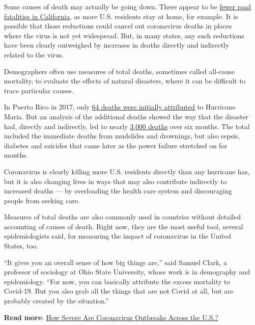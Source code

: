 Some causes of death may actually be going down. There appear to be
\href{https://roadecology.ucdavis.edu/files/content/projects/COVID_CHIPs_Impacts_updated_415.pdf}{fewer
road fatalities in California}, as more U.S. residents stay at home, for
example. It is possible that those reductions could cancel out
coronavirus deaths in places where the virus is not yet widespread. But,
in many states, any such reductions have been clearly outweighed by
increases in deaths directly and indirectly related to the virus.

Demographers often use measures of total deaths, sometimes called
all-cause mortality, to evaluate the effects of natural disasters, where
it can be difficult to trace particular causes.

In Puerto Rico in 2017, only
\href{https://www.nytimes3xbfgragh.onion/2018/08/28/us/puerto-rico-hurricane-maria-deaths.html}{64
deaths were initially attributed} to Hurricane Maria. But an analysis of
the additional deaths showed the way that the disaster had, directly and
indirectly, led to nearly
\href{https://prstudy.publichealth.gwu.edu/sites/prstudy.publichealth.gwu.edu/files/reports/Acertainment\%20of\%20the\%20Estimated\%20Excess\%20Mortality\%20from\%20Hurricane\%20Maria\%20in\%20Puerto\%20Rico.pdf}{3,000
deaths} over six months. The total included the immediate deaths from
mudslides and drownings, but also sepsis, diabetes and suicides that
came later as the power failure stretched on for months.

Coronavirus is clearly killing more U.S. residents directly than any
hurricane has, but it is also changing lives in ways that may also
contribute indirectly to increased deaths --- by overloading the health
care system and discouraging people from seeking care.

Measures of total deaths are also commonly used in countries without
detailed accounting of causes of death. Right now, they are the most
useful tool, several epidemiologists said, for measuring the impact of
coronavirus in the United States, too.

``It gives you an overall sense of how big things are,'' said Samuel
Clark, a professor of sociology at Ohio State University, whose work is
in demography and epidemiology. ``For now, you can basically attribute
the excess mortality to Covid-19. But you also grab all the things that
are not Covid at all, but are probably created by the situation.''

\textbf{Read more}:
\href{https://www.nytimes3xbfgragh.onion/interactive/2020/04/03/upshot/coronavirus-metro-area-tracker.html}{How
Severe Are Coronavirus Outbreaks Across the U.S.?}


